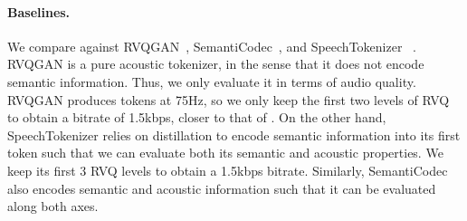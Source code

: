 \paragraph{Baselines.}
We compare against RVQGAN~\citep{kumar2024high}, SemantiCodec~\citep{liu2024semanticodec}, and SpeechTokenizer ~\citep{zhang2024speechtokenizer}. RVQGAN is a pure acoustic tokenizer, in the sense that it does not encode semantic information. Thus, we only evaluate it in terms of audio quality. RVQGAN produces tokens at 75Hz, so we only keep the first two levels of RVQ to obtain a bitrate of 1.5kbps, closer to that of \mimi{}. On the other hand, SpeechTokenizer relies on distillation to encode semantic information into its first token such that we can evaluate both its semantic and acoustic properties. We keep its first 3 RVQ levels to obtain a 1.5kbps bitrate. Similarly, SemantiCodec also encodes semantic and acoustic information such that it can be evaluated along both axes.



\begin{table}[t]
  \centering
  \caption{\textbf{Ablation study on hyper-parameters of the \mimi codec}. We evaluate semantic modeling by reporting the error rate on a phonetic ABX discriminability task. To evaluate the reconstruction quality, we compute VisQOL and MOSNet and collect human judgments with a MUSHRA protocol. ``Quantization rate'' refers to applying quantization to the latent space only $50\%$ of the time during training (independently from quantizer dropout), as described in \hyperref[sec:mimi]{Section ~\ref{sec:mimi}}.}
  \label{tab:mimi_ablations}
\end{table}

